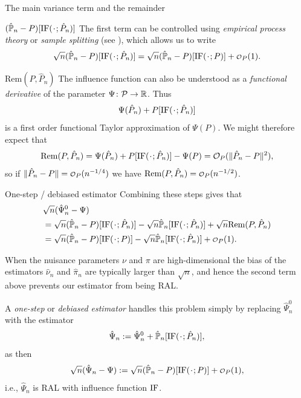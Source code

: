 \documentclass[smaller]{beamer}\usepackage{listings}
\begin{document}
\begin{frame}[label={sec:orgd9e7a95}]{The main variance term and the remainder}
\small
\begin{block}{\((\empmeas-P)[\ic(\blank; \hat{P}_n)]\)}
The first term can be controlled using \emph{empirical process theory} or \emph{sample splitting} (see
\cite{kennedy2022semiparametric}), which allows us to write \[ \sqrt{n}(\empmeas-P)[\ic(\blank;
\hat P_n)] = \sqrt{n}(\empmeas-P)[\ic(\blank; P)] + \smallO_P(1).\]
\end{block}

\begin{block}{\(\mathrm{Rem}(P, \hat{P}_n)\)}
The influence function can also be understood as a \emph{functional derivative} of the parameter
\(\Psi\colon \mathcal{P} \rightarrow \mathbb{R}\). Thus \[\Psi(\hat P_n) + P[\ic(\blank; \hat{P}_n)]\] is a
first order functional Taylor approximation of \(\Psi(P)\). We might therefore expect that \[
\mathrm{Rem}(P, \hat{P}_n) = \Psi(\hat P_n) + P[\ic(\blank; \hat{P}_n)] - \Psi(P) = \mathcal{O}_P(\|
\hat{P}_n -P \|^2), \] so if \(\| \hat{P}_n -P \| = \smallO_P(n^{-1/4})\) we have \(\mathrm{Rem}(P,
\hat{P}_n) = \smallO_P(n^{-1/2})\).
\end{block}
\end{frame}

\begin{frame}[label={sec:org5b883a5}]{One-step / debiased estimator}
\small
Combining these steps gives that
\begin{align*}
  & \sqrt{n}(\hat{\Psi}_n^0 - \Psi) 
  \\
    &  = \sqrt{n}(\empmeas-P)[\ic(\blank; \hat{P}_n)]
    - \sqrt{n}\empmeas[\ic(\blank; \hat{P}_n)]
    + \sqrt{n}\mathrm{Rem}(P,  \hat{P}_n)
    \\
    & =
    \sqrt{n}(\empmeas-P)[\ic(\blank; P)]
    - \sqrt{n}\empmeas[\ic(\blank; \hat{P}_n)]
    + \smallO_P(1).
\end{align*}

When the nuisance parameters \(\nu\) and \(\pi\) are high-dimensional the bias of the estimators
\(\hat{\nu}_n\) and \(\hat{\pi}_n\) are typically larger than \(\sqrt{n}\), and hence the second term
above prevents our estimator from being RAL.

\vfill

A \emph{one-step} or \emph{debiased estimator} handles this problem simply by replacing \(\hat\Psi_n^0\) with
the estimator \[\hat\Psi_n:= \hat\Psi_n^0 + \empmeas[\ic(\blank; \hat{P}_n)],\] as then \[\sqrt n
(\hat\Psi_n - \Psi):= \sqrt{n}(\empmeas-P)[\ic(\blank; P)] + \smallO_P(1),\] i.e., \(\hat\Psi_n\) is
RAL with influence function \(\mathrm{IF}\).
\end{frame}
\end{document}
